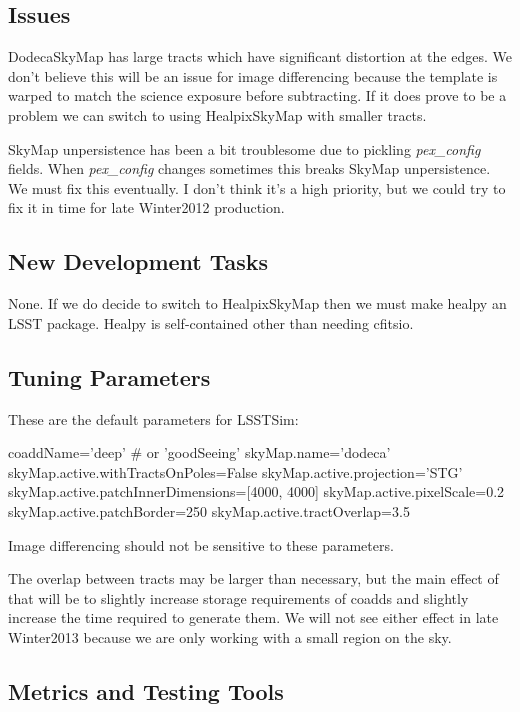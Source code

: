 \documentclass[12pt]{article}
\begin{document}
\subsection{Issues}
DodecaSkyMap has large tracts which have significant distortion at the edges.
We don't believe this will be an issue for image differencing because the template is warped
to match the science exposure before subtracting. If it does prove to be a problem
we can switch to using HealpixSkyMap with smaller tracts.

SkyMap unpersistence has been a bit troublesome due to pickling {\it pex\_config} fields.
When {\it pex\_config} changes sometimes this breaks SkyMap unpersistence. We must fix this eventually.
I don't think it's a high priority, but we could try to fix it in time for late Winter2012 production.

\subsection{New Development Tasks}

None. If we do decide to switch to HealpixSkyMap then we must make healpy an LSST package.
Healpy is self-contained other than needing cfitsio.

\subsection{Tuning Parameters}

These are the default parameters for LSSTSim:

\begin{python}
coaddName='deep' # or 'goodSeeing'
skyMap.name='dodeca'
skyMap.active.withTractsOnPoles=False
skyMap.active.projection='STG'
skyMap.active.patchInnerDimensions=[4000, 4000]
skyMap.active.pixelScale=0.2
skyMap.active.patchBorder=250
skyMap.active.tractOverlap=3.5
\end{python}

Image differencing should not be sensitive to these parameters.

The overlap between tracts may be larger than necessary, but the main effect of that
will be to slightly increase storage requirements of coadds and slightly increase
the time required to generate them. We will not see either effect in late Winter2013
because we are only working with a small region on the sky.

\subsection{Metrics and Testing Tools}
\end{document}
